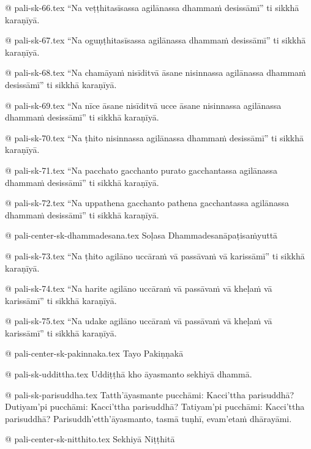 @ pali-sk-66.tex
“Na veṭṭhitasīsassa agilānassa dhammaṁ desissāmī” ti sikkhā karaṇīyā.

@ pali-sk-67.tex
“Na oguṇṭhitasīsassa agilānassa dhammaṁ desissāmī” ti sikkhā karaṇīyā.

@ pali-sk-68.tex
“Na chamāyaṁ nisīditvā āsane nisinnassa agilānassa dhammaṁ desissāmī” ti sikkhā karaṇīyā.

@ pali-sk-69.tex
“Na nīce āsane nisīditvā ucce āsane nisinnassa agilānassa dhammaṁ desissāmī” ti sikkhā karaṇīyā.

@ pali-sk-70.tex
“Na ṭhito nisinnassa agilānassa dhammaṁ desissāmī” ti sikkhā karaṇīyā.

@ pali-sk-71.tex
“Na pacchato gacchanto purato gacchantassa agilānassa dhammaṁ desissāmī” ti sikkhā karaṇīyā.

@ pali-sk-72.tex
“Na uppathena gacchanto pathena gacchantassa agilānassa dhammaṁ desissāmī” ti sikkhā karaṇīyā.

@ pali-center-sk-dhammadesana.tex
Soḷasa Dhammadesanāpaṭisaṁyuttā

@ pali-sk-73.tex
“Na ṭhito agilāno uccāraṁ vā passāvaṁ vā karissāmī” ti sikkhā karaṇīyā.

@ pali-sk-74.tex
“Na harite agilāno uccāraṁ vā passāvaṁ vā kheḷaṁ vā karissāmī” ti sikkhā karaṇīyā.

@ pali-sk-75.tex
“Na udake agilāno uccāraṁ vā passāvaṁ vā kheḷaṁ vā karissāmī” ti sikkhā karaṇīyā.

@ pali-center-sk-pakinnaka.tex
Tayo Pakiṇṇakā

@ pali-sk-uddittha.tex
Uddiṭṭhā kho āyasmanto sekhiyā dhammā.

@ pali-sk-parisuddha.tex
Tatth’āyasmante pucchāmi: Kacci’ttha parisuddhā?
Dutiyam’pi pucchāmi: Kacci’ttha parisuddhā?
Tatiyam’pi pucchāmi: Kacci’ttha parisuddhā?
Parisuddh’etth’āyasmanto, tasmā tuṇhī, evam’etaṁ dhārayāmi.

@ pali-center-sk-nitthito.tex
Sekhiyā Niṭṭhitā
